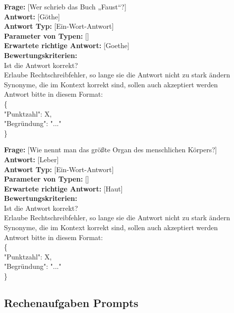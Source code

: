 \documentclass[a4paper,12pt]{article}
\begin{document}
\textbf{Frage:} [Wer schrieb das Buch „Faust“?] \\
\textbf{Antwort:} [Göthe] \\
\textbf{Antwort Typ:} [Ein-Wort-Antwort] \\
\textbf{Parameter von Typen:} [] \\
\textbf{Erwartete richtige Antwort:} [Goethe] \\
\textbf{Bewertungskriterien:} \\
Ist die Antwort korrekt? \\
Erlaube Rechtschreibfehler, so lange sie die Antwort nicht zu stark ändern \\
Synonyme, die im Kontext korrekt sind, sollen auch akzeptiert werden \\
Antwort bitte in diesem Format: \\
\{ \\
"Punktzahl": X, \\
"Begründung": "..." \\
\}

\vspace{1em}

\textbf{Frage:} [Wie nennt man das größte Organ des menschlichen Körpers?] \\
\textbf{Antwort:} [Leber] \\
\textbf{Antwort Typ:} [Ein-Wort-Antwort] \\
\textbf{Parameter von Typen:} [] \\
\textbf{Erwartete richtige Antwort:} [Haut] \\
\textbf{Bewertungskriterien:} \\
Ist die Antwort korrekt? \\
Erlaube Rechtschreibfehler, so lange sie die Antwort nicht zu stark ändern \\
Synonyme, die im Kontext korrekt sind, sollen auch akzeptiert werden \\
Antwort bitte in diesem Format: \\
\{ \\
"Punktzahl": X, \\
"Begründung": "..." \\
\}

\subsection{Rechenaufgaben Prompts}
\end{document}
